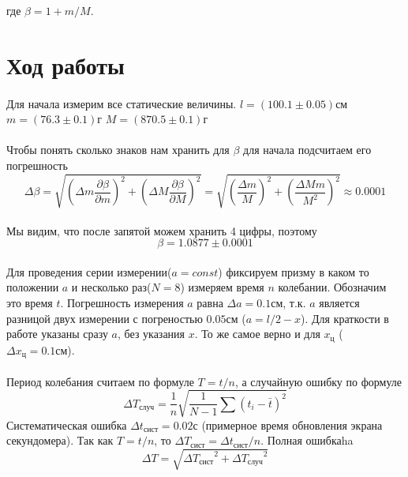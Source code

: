\documentclass[a4paper, 12pt]{article}
\begin{document}
    где $\beta=1+m/M$.

    \newpage

    \section{Ход работы}
    \paragraph{}
    Для начала измерим все статические величины.
    \vspace{0.5cm}
    \newline$l=(100.1\pm0.05)см$
    \newline$m=(76.3\pm0.1)г$
    \newline$M=(870.5\pm0.1)г$
    \vspace{0.5cm}

    \paragraph{}
    Чтобы понять сколько знаков нам хранить для $\beta$ для начала подсчитаем его погрешность
    \begin{equation}
        \Delta\beta=\sqrt{(\Delta m \frac{\partial \beta}{\partial m})^{2} +
                          (\Delta M \frac{\partial \beta}{\partial M})^{2}} =
                  \sqrt{(\frac{\Delta m}{M})^{2} + (\frac{\Delta M m}{M^{2}})^{2}} \approx 0.0001
    \end{equation}


    \paragraph{}
    Мы видим, что после запятой можем хранить 4 цифры, поэтому
    \[\beta=1.0877\pm0.0001\]

    \paragraph{}
    Для проведения серии измерении($a=const$) фиксируем призму в каком то положении $a$ и несколько раз($N=8$) измеряем время $n$ колебании. Обозначим это время $t$. Погрешность измерения $a$ равна $\Delta a=0.1см$, т.к. $a$ является разницой двух измерении с погреностью $0.05см$ ($a=l/2 - x$). Для краткости в работе указаны сразу $a$, без указания $x$. То же самое верно и для $x_ц$ ($\Delta x_ц = 0.1см$).
    \paragraph{}
    Период колебания считаем по формуле $T=t/n$, а случайную ошибку по формуле
    \[\Delta T_{случ} = \frac{1}{n} \sqrt{\frac{1}{N-1}\sum{(t_i - \bar{t})^{2}}}\]
    Систематическая ошибка $\Delta t_{сист}=0.02с$ (примерное время обновления экрана секундомера). Так как $T=t/n$, то $\Delta T_{сист}=\Delta t_{сист}/n$. Полная ошибкаha
    \[\Delta T = \sqrt{{\Delta T_{сист}}^{2} + {\Delta T_{случ}}^{2}}\]
    \newpage
\end{document}
